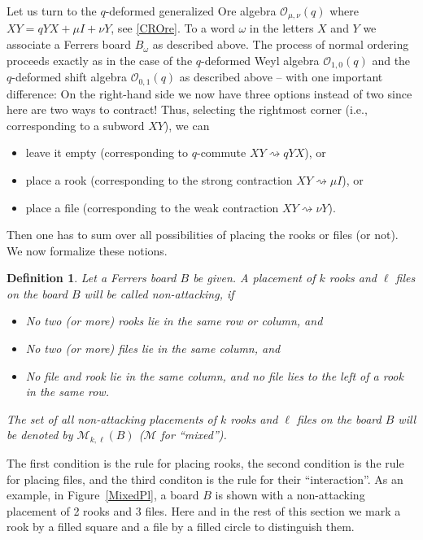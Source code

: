 \documentclass[10pt]{amsart}
\newtheorem{definition}[theorem]{Definition}
\begin{document}
Let us turn to the $q$-deformed generalized Ore algebra ${\mathcal O}_{\mu,\nu}(q)$ where $XY=qYX+\mu I + \nu Y$, see \eqref{CROre}. To a word $\omega$ in the letters $X$ and $Y$ we associate a Ferrers board $B_{\omega}$ as described above. The process of normal ordering proceeds exactly as in the case of the $q$-deformed Weyl algebra ${\mathcal O}_{1,0}(q)$ and the $q$-deformed shift algebra ${\mathcal O}_{0,1}(q)$ as described above -- with one important difference: On the right-hand side we now have three options instead of two since here are two ways to contract! Thus, selecting the rightmost corner (i.e., corresponding to a subword $XY$), we can 
\begin{itemize}
\item leave it empty (corresponding to $q$-commute $XY \rightsquigarrow q YX$), or
\item place a rook (corresponding to the strong contraction $XY \rightsquigarrow \mu I$), or
\item place a file (corresponding to the weak contraction $XY \rightsquigarrow \nu Y$).
\end{itemize}
Then one has to sum over all possibilities of placing the rooks or files (or not). We now formalize these notions. 

\begin{definition}
Let a Ferrers board $B$ be given. A placement of $k$ rooks and $\ell$ files on the board $B$ will be called {\em non-attacking}, if 
\begin{itemize}
\item No two (or more) rooks lie in the same row or column, and
\item No two (or more) files lie in the same column, and
\item No file and rook lie in the same column, and no file lies to the left of a rook in the same row.
\end{itemize}
The set of all non-attacking placements of $k$ rooks and $\ell$ files on the board $B$ will be denoted by $\mathcal{M}_{k,\ell}(B)$ ($\mathcal{M}$ for ``mixed''). 
\end{definition}
The first condition is the rule for placing rooks, the second condition is the rule for placing files, and the third conditon is the rule for their ``interaction''. As an example, in Figure~\ref{MixedPl}, a board $B$ is shown with a non-attacking placement of 2 rooks and 3 files. Here and in the rest of this section we mark a rook by a filled square and a file by a filled circle to distinguish them. 
\end{document}
